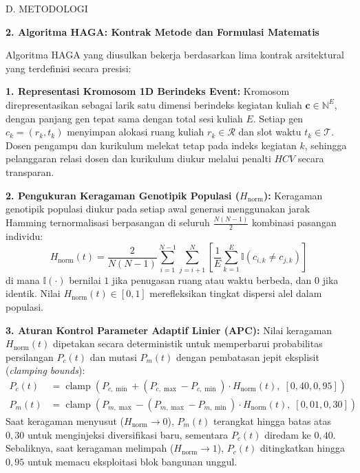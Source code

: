 \documentclass[letterpaper,12pt,oneside]{article}
\newcommand{\subheading}[2]{%
  \par\vspace{0.8em}\noindent
  \textbf{#1. #2}\par\vspace{0.3em}
}
\begin{document}
\begin{wordsection}{D. METODOLOGI}
\subheading{2}{Algoritma HAGA: Kontrak Metode dan Formulasi Matematis}

Algoritma HAGA yang diusulkan bekerja berdasarkan lima kontrak arsitektural yang terdefinisi secara presisi:

\noindent\textbf{1. Representasi Kromosom 1D Berindeks Event:}
Kromosom direpresentasikan sebagai larik satu dimensi berindeks kegiatan kuliah $\mathbf{c} \in \mathbb{N}^E$, dengan panjang gen tepat sama dengan total sesi kuliah $E$. Setiap gen $c_k = (r_k, t_k)$ menyimpan alokasi ruang kuliah $r_k \in \mathcal{R}$ dan slot waktu $t_k \in \mathcal{T}$. Dosen pengampu dan kurikulum melekat tetap pada indeks kegiatan $k$, sehingga pelanggaran relasi dosen dan kurikulum diukur melalui penalti $HCV$ secara transparan.

\noindent\textbf{2. Pengukuran Keragaman Genotipik Populasi ($H_{\text{norm}}$):}
Keragaman genotipik populasi diukur pada setiap awal generasi menggunakan jarak Hamming ternormalisasi berpasangan di seluruh $\frac{N(N-1)}{2}$ kombinasi pasangan individu:
\begin{equation}
    H_{\text{norm}}(t) = \frac{2}{N(N-1)} \sum_{i=1}^{N-1} \sum_{j=i+1}^{N} \left[ \frac{1}{E} \sum_{k=1}^{E} \mathbb{I}(c_{i,k} \neq c_{j,k}) \right]
\end{equation}
di mana $\mathbb{I}(\cdot)$ bernilai $1$ jika penugasan ruang atau waktu berbeda, dan $0$ jika identik. Nilai $H_{\text{norm}}(t) \in [0, 1]$ merefleksikan tingkat dispersi alel dalam populasi.

\noindent\textbf{3. Aturan Kontrol Parameter Adaptif Linier (APC):}
Nilai keragaman $H_{\text{norm}}(t)$ dipetakan secara deterministik untuk memperbarui probabilitas persilangan $P_c(t)$ dan mutasi $P_m(t)$ dengan pembatasan jepit eksplisit (\textit{clamping bounds}):
\begin{align}
    P_c(t) &= \operatorname{clamp}\left( P_{c,\min} + (P_{c,\max} - P_{c,\min}) \cdot H_{\text{norm}}(t), \; [0{,}40, 0{,}95] \right) \\
    P_m(t) &= \operatorname{clamp}\left( P_{m,\max} - (P_{m,\max} - P_{m,\min}) \cdot H_{\text{norm}}(t), \; [0{,}01, 0{,}30] \right)
\end{align}
Saat keragaman menyusut ($H_{\text{norm}} \to 0$), $P_m(t)$ terangkat hingga batas atas $0{,}30$ untuk menginjeksi diversifikasi baru, sementara $P_c(t)$ diredam ke $0{,}40$. Sebaliknya, saat keragaman melimpah ($H_{\text{norm}} \to 1$), $P_c(t)$ ditingkatkan hingga $0{,}95$ untuk memacu eksploitasi blok bangunan unggul.


\end{wordsection}
\end{document}

